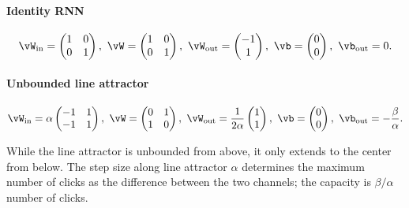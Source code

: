 \documentclass{article}
\newcounter{ct}
\newcommand{\win}{\vW_{\text{in}}}
\newcommand{\wout}{\vW_{\text{out}}}
\newcommand{\bout}{\vb_{\text{out}}}
\theoremstyle{definition}
\theoremstyle{remark}
\begin{document}
\paragraph{Identity RNN}
\label{sec:ubpa,sec:iRNN}
\begin{equation}\label{eq:irnn}
\win = 
\begin{pmatrix}
1  &  0 \\
0 &  1
\end{pmatrix}, \
\vW = 
\begin{pmatrix}
1  &  0 \\
0  &  1
\end{pmatrix}, \
\wout = 
\begin{pmatrix}
-1  \\  1 
\end{pmatrix}, \
\vb = 
\begin{pmatrix}
0  \\ 0
\end{pmatrix}, \
\bout = 0.
\end{equation}


\paragraph{Unbounded line attractor}
\label{sec:ubla}
\begin{equation}\label{eq:ubla}
\win = \alpha
\begin{pmatrix}
-1  &  1 \\
-1  &  1
\end{pmatrix}, \
\vW = 
\begin{pmatrix}
0  &  1 \\
1  &  0
\end{pmatrix}, \
\wout = \frac{1}{2\alpha}
\begin{pmatrix}
1  \\  1 
\end{pmatrix}, \
\vb = 
\begin{pmatrix}
0  \\  0
\end{pmatrix}, \
\bout = -\frac{\beta}{\alpha}.
\end{equation}

While the line attractor is unbounded from above, it only extends to the center from below.  The  step size along line attractor $\alpha$ determines the maximum number of clicks as the difference between the two channels; the capacity is $\beta/\alpha$ number of clicks.
\end{document}
